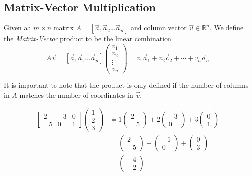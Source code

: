 \subsection{Matrix-Vector Multiplication}

\begin{definition}
Given an $m \times n$ matrix $A=[\vec{a}_1 \vec{a}_2 \ldots \vec{a}_n]$ and column vector $\vec{v} \in \mathbb{R}^n$. We define the \emph{Matrix-Vector} product to be the linear combination 
\[
A\vec{v}=[\vec{a}_1 \vec{a}_2 \ldots \vec{a}_n]\begin{pmatrix}v_1 \\ v_2 \\ \vdots \\ v_n \end{pmatrix}=v_1\vec{a}_1+v_2\vec{a}_2+\cdots+v_n\vec{a}_n
\]
\end{definition} 
\begin{remark}
It is important to note that the product is only defined if the number of columns in $A$ matches the number of coordinates in $\vec{v}$.
\end{remark}

\begin{example}
\begin{align*}
\left[\begin{array}{rrr}
2 & {-3} & 0 \\
{-5} & 0 & 1 \end{array}\right]\begin{pmatrix}1\\ 2 \\ 3 \end{pmatrix}
&=1\left(\begin{array}{r}2\\{-5}\end{array}\right)+2\left(\begin{array}{r}{-3}\\0\end{array}\right)+3\left(\begin{array}{r}0\\1\end{array}\right)\\
&=\left(\begin{array}{r}2\\{-5}\end{array}\right)+\left(\begin{array}{r}{-6}\\ 0\end{array}\right)+\left(\begin{array}{r}0\\3\end{array}\right)\\
&=\left(\begin{array}{r}{-4}\\{-2}\end{array}\right)
\end{align*}
\end{example}

